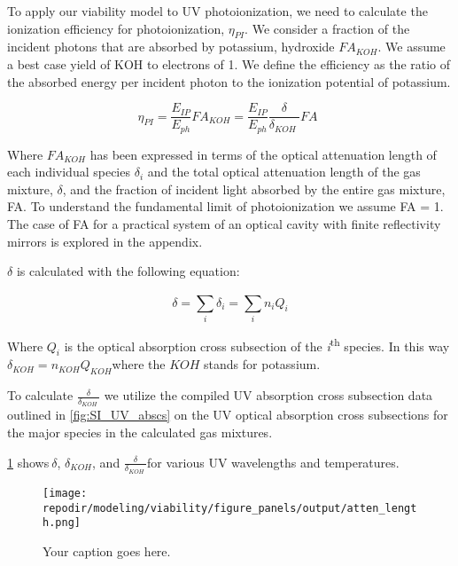 To apply our viability model to UV photoionization, we need to calculate the ionization efficiency for photoionization, \(\eta_{PI}\). We consider a fraction of the incident photons that are absorbed by potassium, hydroxide \(FA_{KOH}\). We assume a best case yield of KOH to electrons of 1. We define the efficiency as the ratio of the absorbed energy per incident photon to the ionization potential of potassium.


\begin{equation}
\eta_{PI} = \frac{E_{IP}}{E_{ph}}FA_{KOH} = \frac{E_{IP}}{E_{ph}}\frac{\delta}{\delta_{KOH}\ }FA\ \ 
\end{equation}

Where \(FA_{KOH}\) has been expressed in terms of the optical attenuation length of each individual species \(\delta_{i}\) and the total optical attenuation length of the gas mixture, \(\delta\), and the fraction of incident light absorbed by the entire gas mixture, FA. To understand the fundamental limit of photoionization we assume FA = 1. The case of FA for a practical system of an optical cavity with finite reflectivity mirrors is explored in the appendix.

\(\delta\) is calculated with the following equation:

\begin{equation}
\delta = \sum_{i}^{}\delta_{i} = \sum_{i}^{}{n_{i}Q_{i}}
\end{equation}

Where \(Q_{i}\) is the optical absorption cross subsection of the \emph{i}\textsuperscript{th} species. In this way \(\delta_{KOH} = n_{KOH}Q_{KOH}\)where the \(KOH\) stands for potassium.

To calculate \(\frac{\delta}{\delta_{KOH}\ }\) we utilize the compiled UV absorption cross subsection data outlined in \ref{fig:SI_UV_abscs} on the UV optical absorption cross subsections for the major species in the calculated gas mixtures.

\ref{fig:SI_atten_length} shows\(\ \delta\), \(\delta_{KOH}\), and \(\frac{\delta}{\delta_{KOH}\ }\)for various UV wavelengths and temperatures.


\begin{figure}[ht]
    \centering
    \texttt{[image: \\repodir/modeling/viability/figure\_panels/output/atten\_length.png]}
    \caption{Your caption goes here.}
    \label{fig:SI_atten_length}
\end{figure}


